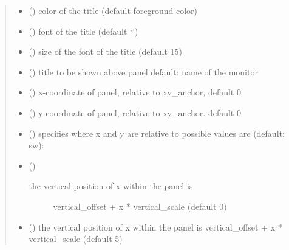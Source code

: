 \documentclass[letterpaper,10pt,english]{sphinxmanual}
\begin{document}
\begin{fulllineitems}
\begin{quote}
\begin{description}
\begin{itemize}
\item {} 
 () \textendash{} color of the title (default foreground color)

\item {} 
 () \textendash{} font of the title (default ‘’)

\item {} 
 () \textendash{} size of the font of the title (default 15)

\item {} 
 () \textendash{} title to be shown above panel 
default: name of the monitor

\item {} 
 () \textendash{} x-coordinate of panel, relative to xy\_anchor, default 0

\item {} 
 () \textendash{} y-coordinate of panel, relative to xy\_anchor. default 0

\item {} 
 () \textendash{} specifies where x and y are relative to 
possible values are (default: sw): 

\item {} 
 () \textendash{} \begin{description}
\item[{the vertical position of x within the panel is}] \leavevmode
vertical\_offset + x * vertical\_scale (default 0)

\end{description}


\item {} 
 () \textendash{} the vertical position of x within the panel is
vertical\_offset + x * vertical\_scale (default 5)


\end{itemize}
\end{description}
\end{quote}
\end{fulllineitems}
\end{document}
